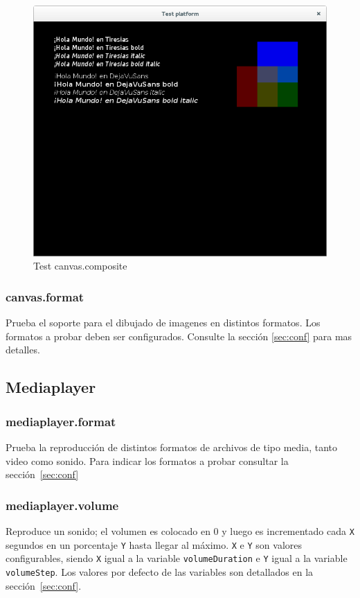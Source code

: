 \documentclass{article}
\begin{document}
\begin{figure}[h]
\centering
\includegraphics[scale=0.45]{composite}
\caption{Test canvas.composite}
\label{fig:canvas_composite}
\end{figure}

\FloatBarrier

\subsubsection{canvas.format}
Prueba el soporte para el dibujado de imagenes en distintos formatos. Los formatos a probar deben ser configurados. Consulte la sección \ref{sec:conf} para mas detalles.

\subsection{Mediaplayer}
\label{sec:mediaplayer_test}

\FloatBarrier
\subsubsection{mediaplayer.format}
Prueba la reproducción de distintos formatos de archivos de tipo media, tanto video como sonido. Para indicar los formatos a probar consultar la sección~\ref{sec:conf}

\FloatBarrier
\subsubsection{mediaplayer.volume}
\label{sec:mediaplayer_volume}
Reproduce un sonido; el volumen es colocado en 0 y luego es incrementado cada \texttt{X} segundos en un porcentaje \texttt{Y} hasta llegar al máximo.
\texttt{X} e \texttt{Y} son valores configurables, siendo \texttt{X} igual a la variable \texttt{volumeDuration} e \texttt{Y} igual a la variable \texttt{volumeStep}. Los valores por defecto de las variables son detallados en la sección~\ref{sec:conf}.
\end{document}
